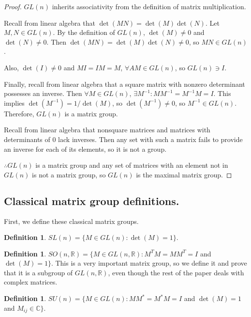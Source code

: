 \documentclass[12pt]{article}
\newcommand{\C}{\mathbb{C}}
\newcommand{\R}{\mathbb{R}}
\newcommand{\sun}{SU (n)}
\newcommand{\son}{SO (n, \R)}
\theoremstyle{definition}
\theoremstyle{definition}
\theoremstyle{definition}
\theoremstyle{definition}
\theoremstyle{definition}
\newtheorem{defn}[them]{Definition}
\theoremstyle{definition}
\theoremstyle{definition}
\theoremstyle{definition}
\begin{document}
\begin{proof}
\par{$GL(n)$ inherits associativity from the
definition of matrix multiplication.} 
\par{Recall from linear algebra that $\det(MN) =
\det(M)\det(N)$. Let $M, N \in GL(n)$. By the
definition of $GL(n)$, $\det(M) \neq 0$ and
$\det(N) \neq 0$. Then $\det(MN) = \det(M)\det(N)
\neq 0$, so $MN \in GL(n)$.} \par{Also, $\det(I)
\neq 0$ and $MI = IM = M$, $\forall AM\in GL(n)$,
so $GL(n) \ni I$.} 
\par{Finally, recall from linear algebra that a
square matrix with nonzero determinant possesses
an inverse. Then $\forall M \in GL(n)$, $\exists
M^{-1}: MM^{-1} = M^{-1}M = I$. This implies
$\det(M^{-1}) = 1/ \det(M)$, so $\det(M^{-1}) \neq
0$, so $M^{-1} \in GL(n)$. Therefore, $GL(n)$ is a
matrix group.}

\par{Recall from linear algebra that nonsquare
matrices and matrices with determinants of $0$
lack inverses. Then any set with such a matrix
fails to provide an inverse for each of its
elements, so it is not a group.}

\par{$\therefore GL(n)$ is a matrix group and any set
of matrices with an element not in $GL(n)$ is not
a matrix group, so $GL(n)$ is the maximal matrix
group.}
\end{proof}

\subsection{Classical matrix group definitions.}
\par{First, we define these classical matrix groups.}

\begin{defn}
$SL(n) = \{M \in GL(n): \det(M) = 1\}$.
\end{defn}

\begin{defn}
$\son = \{M \in
GL(n, \R): M^T M = M M^T = I$ and $\det(M) = 1\}$. This is a very
important matrix group, so we define it and
prove that it is a subgroup of $GL(n, \R)$, even
though the rest of the paper deals with
complex matrices.
\end{defn}

\begin{defn}
$\sun = \{M \in GL(n) : MM^*
= M^*M = I$ and $\det(M) = 1$ and $M_{ij} \in
\C\}$.
\end{defn}
\end{document}
